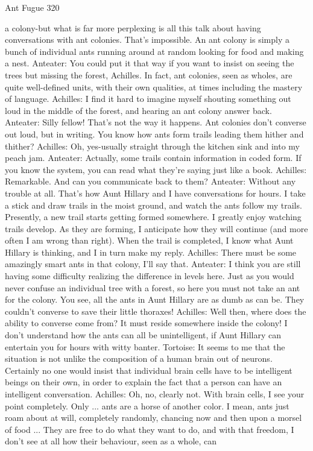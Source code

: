 Ant Fugue                                                                                 320

    a colony-but what is far more perplexing is all this talk about having conversations
    with ant colonies. That's impossible. An ant colony is simply a bunch of individual
    ants running around at random looking for food and making a nest.
Anteater: You could put it that way if you want to insist on seeing the trees but missing
    the forest, Achilles. In fact, ant colonies, seen as wholes, are quite well-defined units,
    with their own qualities, at times including the mastery of language.
Achilles: I find it hard to imagine myself shouting something out loud in the middle of
    the forest, and hearing an ant colony answer back.
Anteater: Silly fellow! That's not the way it happens. Ant colonies don't converse out
    loud, but in writing. You know how ants form trails leading them hither and thither?
Achilles: Oh, yes-usually straight through the kitchen sink and into my peach jam.
Anteater: Actually, some trails contain information in coded form. If you know the
    system, you can read what they're saying just like a book. Achilles: Remarkable. And
    can you communicate back to them? Anteater: Without any trouble at all. That's how
    Aunt Hillary and I have conversations for hours. I take a stick and draw trails in the
    moist ground, and watch the ants follow my trails. Presently, a new trail starts getting
    formed somewhere. I greatly enjoy watching trails develop. As they are forming, I
    anticipate how they will continue (and more often I am wrong than right). When the
    trail is completed, I know what Aunt Hillary is thinking, and I in turn make my reply.
Achilles: There must be some amazingly smart ants in that colony, I'll say that.
Anteater: I think you are still having some difficulty realizing the difference in levels
    here. Just as you would never confuse an individual tree with a forest, so here you
    must not take an ant for the colony. You see, all the ants in Aunt Hillary are as dumb
    as can be. They couldn't converse to save their little thoraxes!
Achilles: Well then, where does the ability to converse come from? It must reside
    somewhere inside the colony! I don't understand how the ants can all be unintelligent,
    if Aunt Hillary can entertain you for hours with witty banter.
Tortoise: It seems to me that the situation is not unlike the composition of a human brain
    out of neurons. Certainly no one would insist that individual brain cells have to be
    intelligent beings on their own, in order to explain the fact that a person can have an
    intelligent conversation.
Achilles: Oh, no, clearly not. With brain cells, I see your point completely. Only ... ants
    are a horse of another color. I mean, ants just roam about at will, completely
    randomly, chancing now and then upon a morsel of food ... They are free to do what
    they want to do, and with that freedom, I don’t see at all how their behaviour, seen as
    a whole, can




